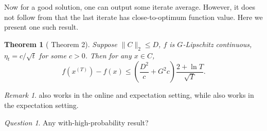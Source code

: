 \documentclass[openany]{book}
\newtheorem{theorem}{Theorem}[chapter]
\theoremstyle{definition}
\theoremstyle{remark}
\newtheorem*{remark}{Remark}
\newtheorem*{question}{Question}
\begin{document}
%
%

Now for a good solution, one can output some iterate average. However, it does not follow from  that the last iterate has close-to-optimum function value. Here we present one such result.
\begin{theorem}[\cite{SZ13} Theorem 2]\label{thm:GDLastBound}
    Suppose $\|C\|_2\le D$, $f$ is $G$-Lipschitz continuous, $\eta_t=c/\sqrt{t}$ for some $c>0$. Then for any $x\in C$,
    \begin{equation*}
        f(x^{(T)})-f(x)\le\left(\frac{D^2}{c}+G^2c\right)\frac{2+\ln T}{\sqrt{T}}.
    \end{equation*}
\end{theorem}
\begin{remark}
     also works in the online and expectation setting, while  also works in the expectation setting.
\end{remark}
\begin{question}
    Any with-high-probability result?
\end{question}
\end{document}
